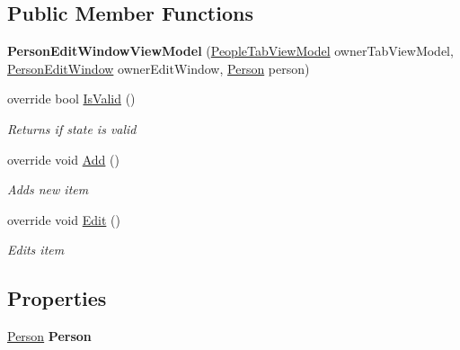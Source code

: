 \subsection*{Public Member Functions}
\begin{DoxyCompactItemize}
\item 
\hypertarget{class_baudi_1_1_client_1_1_view_models_1_1_edit_window_view_models_1_1_person_edit_window_view_model_a0e98f06901d0d10cc664dda3aa93728b}{}{\bfseries Person\+Edit\+Window\+View\+Model} (\hyperlink{class_baudi_1_1_client_1_1_view_models_1_1_tabs_view_models_1_1_people_tab_view_model}{People\+Tab\+View\+Model} owner\+Tab\+View\+Model, \hyperlink{class_baudi_1_1_client_1_1_view_1_1_edit_windows_1_1_person_edit_window}{Person\+Edit\+Window} owner\+Edit\+Window, \hyperlink{class_baudi_1_1_d_a_l_1_1_models_1_1_person}{Person} person)\label{class_baudi_1_1_client_1_1_view_models_1_1_edit_window_view_models_1_1_person_edit_window_view_model_a0e98f06901d0d10cc664dda3aa93728b}

\item 
override bool \hyperlink{class_baudi_1_1_client_1_1_view_models_1_1_edit_window_view_models_1_1_person_edit_window_view_model_ae8d99ae35fac6e5a4bdf2406288dcfd4}{Is\+Valid} ()
\begin{DoxyCompactList}\small\item\em Returns if state is valid \end{DoxyCompactList}\item 
override void \hyperlink{class_baudi_1_1_client_1_1_view_models_1_1_edit_window_view_models_1_1_person_edit_window_view_model_a2fdc1ebb1fff25334b1e0ee50dffc4de}{Add} ()
\begin{DoxyCompactList}\small\item\em Adds new item \end{DoxyCompactList}\item 
override void \hyperlink{class_baudi_1_1_client_1_1_view_models_1_1_edit_window_view_models_1_1_person_edit_window_view_model_a2d52c4d871da4de6e7e211a1408489d6}{Edit} ()
\begin{DoxyCompactList}\small\item\em Edits item \end{DoxyCompactList}\end{DoxyCompactItemize}
\subsection*{Properties}
\begin{DoxyCompactItemize}
\item 
\hypertarget{class_baudi_1_1_client_1_1_view_models_1_1_edit_window_view_models_1_1_person_edit_window_view_model_a4adf0281b950df8fd2b8fb1402bc10b5}{}\hyperlink{class_baudi_1_1_d_a_l_1_1_models_1_1_person}{Person} {\bfseries Person}\label{class_baudi_1_1_client_1_1_view_models_1_1_edit_window_view_models_1_1_person_edit_window_view_model_a4adf0281b950df8fd2b8fb1402bc10b5}

\end{DoxyCompactItemize}
